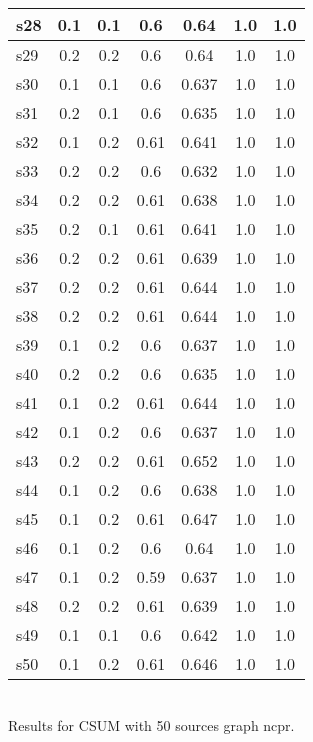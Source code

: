 \documentclass{article}
\begin{document}
\begin{tabular}{|l|c|c|c|c|c|c|}
\hline
s28 &0.1 & 0.1 & 0.6 & 0.64 & 1.0 & 1.0\\
\hline
s29 &0.2 & 0.2 & 0.6 & 0.64 & 1.0 & 1.0\\
\hline
s30 &0.1 & 0.1 & 0.6 & 0.637 & 1.0 & 1.0\\
\hline
s31 &0.2 & 0.1 & 0.6 & 0.635 & 1.0 & 1.0\\
\hline
s32 &0.1 & 0.2 & 0.61 & 0.641 & 1.0 & 1.0\\
\hline
s33 &0.2 & 0.2 & 0.6 & 0.632 & 1.0 & 1.0\\
\hline
s34 &0.2 & 0.2 & 0.61 & 0.638 & 1.0 & 1.0\\
\hline
s35 &0.2 & 0.1 & 0.61 & 0.641 & 1.0 & 1.0\\
\hline
s36 &0.2 & 0.2 & 0.61 & 0.639 & 1.0 & 1.0\\
\hline
s37 &0.2 & 0.2 & 0.61 & 0.644 & 1.0 & 1.0\\
\hline
s38 &0.2 & 0.2 & 0.61 & 0.644 & 1.0 & 1.0\\
\hline
s39 &0.1 & 0.2 & 0.6 & 0.637 & 1.0 & 1.0\\
\hline
s40 &0.2 & 0.2 & 0.6 & 0.635 & 1.0 & 1.0\\
\hline
s41 &0.1 & 0.2 & 0.61 & 0.644 & 1.0 & 1.0\\
\hline
s42 &0.1 & 0.2 & 0.6 & 0.637 & 1.0 & 1.0\\
\hline
s43 &0.2 & 0.2 & 0.61 & 0.652 & 1.0 & 1.0\\
\hline
s44 &0.1 & 0.2 & 0.6 & 0.638 & 1.0 & 1.0\\
\hline
s45 &0.1 & 0.2 & 0.61 & 0.647 & 1.0 & 1.0\\
\hline
s46 &0.1 & 0.2 & 0.6 & 0.64 & 1.0 & 1.0\\
\hline
s47 &0.1 & 0.2 & 0.59 & 0.637 & 1.0 & 1.0\\
\hline
s48 &0.2 & 0.2 & 0.61 & 0.639 & 1.0 & 1.0\\
\hline
s49 &0.1 & 0.1 & 0.6 & 0.642 & 1.0 & 1.0\\
\hline
s50 &0.1 & 0.2 & 0.61 & 0.646 & 1.0 & 1.0\\
\hline
\end{tabular}\\

\noindent Results for CSUM with 50 sources graph ncpr.
\end{document}
